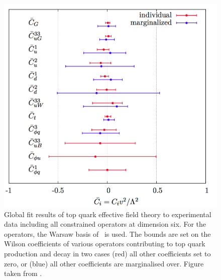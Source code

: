 \begin{figure}[htbp]
	\centering
	\includegraphics[width=1.0\linewidth]{1_Introduction/Figures/anomlouscouplings}
	\caption{Global fit results of top quark effective field theory to experimental data including all constrained operators at dimension six. For the operators, the Warsaw basis of~\cite{Grzadkowski:2010es} is used. The bounds are set on the Wilson coefficients of various operators contributing to top quark production and decay in two cases (red) all other coefficients set to zero, or (blue) all other coefficients are marginalised over. Figure taken from \cite{Buckley:2015lku}. }
	\label{fig:anomlouscouplings}
\end{figure}



